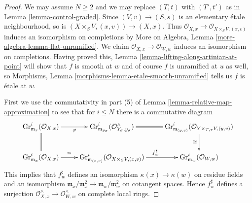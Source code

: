\documentclass[10pt,a4paper]{amsart}
\theoremstyle{plain}
\theoremstyle{definition}
\theoremstyle{remark}
\numberwithin{equation}{subsection}
\begin{document}
\begin{proof}
We may assume $N \geq 2$ and we may replace $(T, t)$ with $(T', t')$ as in
Lemma \ref{lemma-control-graded}. Since $(V, v) \to (S, s)$ is an elementary
\'etale neighbourhood, so is $(X \times_S V, (x, v)) \to (X, x)$.
Thus $\mathcal{O}_{X, x} \to \mathcal{O}_{X \times_S V, (x, v)}$
induces an isomorphism on completions by
More on Algebra, Lemma \ref{more-algebra-lemma-flat-unramified}.
We claim $\mathcal{O}_{X, x} \to \mathcal{O}_{W, w}$ induces
an isomorphism on completions. Having proved this,
Lemma \ref{lemma-lifting-along-artinian-at-point}
will show that $f$ is smooth at $w$ and of course
$f$ is unramified at $u$ as well, so
Morphisms, Lemma \ref{morphisms-lemma-etale-smooth-unramified}
tells us $f$ is \'etale at $w$.

\medskip\noindent
First we use the commutativity in part (5) of
Lemma \ref{lemma-relative-map-approximation}
to see that for $i \leq N$ there is a commutative diagram
$$
\xymatrix{
\text{Gr}^i_{\mathfrak m_x}(\mathcal{O}_{X, x})
\ar[r]_-\varphi &
\text{Gr}^i_{\mathfrak m_{y_\sigma}}(\mathcal{O}_{Y_\sigma, y_\sigma}^\wedge)
\ar@{=}[r] &
\text{Gr}^i_{\mathfrak m_{(y, v)}}(\mathcal{O}_{Y \times_{T, \tau} V, (y, v)})
\ar[d]_{\cong} \\
\text{Gr}^i_{\mathfrak m_x}(\mathcal{O}_{X, x})
\ar[r]^-{\cong} \ar@{=}[u] &
\text{Gr}^i_{\mathfrak m_{(x, v)}}(\mathcal{O}_{X \times_S V, (x, v)})
\ar[r]^{f^\sharp_w} &
\text{Gr}^i_{\mathfrak m_w}(\mathcal{O}_{W, w})
}
$$
This implies that $f^\sharp_w$ defines an isomorphism
$\kappa(x) \to \kappa(w)$ on residue fields and an isomorphism
$\mathfrak m_x/\mathfrak m_x^2 \to \mathfrak m_w/\mathfrak m_w^2$
on cotangent spaces. Hence $f^\sharp_w$ defines a surjection
$\mathcal{O}_{X, x}^\wedge \to \mathcal{O}_{W, w}^\wedge$
on complete local rings.


\end{proof}
\end{document}
